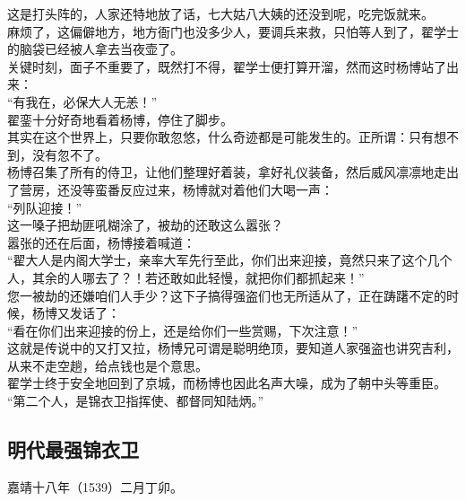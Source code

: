 \begin{multicols}{\theparacolNo}
这是打头阵的，人家还特地放了话，七大姑八大姨的还没到呢，吃完饭就来。\\

麻烦了，这偏僻地方，地方衙门也没多少人，要调兵来救，只怕等人到了，翟学士的脑袋已经被人拿去当夜壶了。\\

关键时刻，面子不重要了，既然打不得，翟学士便打算开溜，然而这时杨博站了出来：\\

“有我在，必保大人无恙！”\\

翟銮十分好奇地看着杨博，停住了脚步。\\

其实在这个世界上，只要你敢忽悠，什么奇迹都是可能发生的。正所谓：只有想不到，没有忽不了。\\

杨博召集了所有的侍卫，让他们整理好着装，拿好礼仪装备，然后威风凛凛地走出了营房，还没等蛮番反应过来，杨博就对着他们大喝一声：\\

“列队迎接！”\\

这一嗓子把劫匪吼糊涂了，被劫的还敢这么嚣张？\\

嚣张的还在后面，杨博接着喊道：\\

“翟大人是内阁大学士，亲率大军先行至此，你们出来迎接，竟然只来了这个几个人，其余的人哪去了？！若还敢如此轻慢，就把你们都抓起来！”\\

您一被劫的还嫌咱们人手少？这下子搞得强盗们也无所适从了，正在踌躇不定的时候，杨博又发话了：\\

“看在你们出来迎接的份上，还是给你们一些赏赐，下次注意！”\\

这就是传说中的又打又拉，杨博兄可谓是聪明绝顶，要知道人家强盗也讲究吉利，从来不走空趟，给点钱也是个意思。\\

翟学士终于安全地回到了京城，而杨博也因此名声大噪，成为了朝中头等重臣。\\

“第二个人，是锦衣卫指挥使、都督同知陆炳。”\\

\subsection{明代最强锦衣卫}
嘉靖十八年（1539）二月丁卯。\\


\end{multicols}
